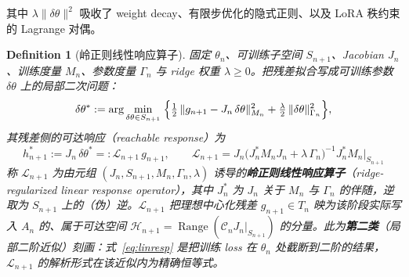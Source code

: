 \documentclass[11pt,a4paper]{article}
\newtheorem{definition}[theorem]{Definition}
\newcommand{\cL}{\mathcal{L}}
\newcommand{\cH}{\mathcal{H}}
\newcommand{\Range}{\operatorname{Range}}
\newcommand{\Center}{\mathcal{C}}
\begin{document}
其中 $\lambda\|\delta\theta\|^2$ 吸收了 weight decay、有限步优化的隐式正则、以及 LoRA 秩约束的 Lagrange 对偶。


\begin{definition}[岭正则线性响应算子]\label{def:linresp}
固定 $\theta_n$、可训练子空间 $S_{n+1}$、Jacobian $J_n$、训练度量 $M_n$、参数度量 $\Gamma_n$ 与 ridge 权重 $\lambda\ge 0$。把残差拟合写成可训练参数 $\delta\theta$ 上的局部二次问题：
\begin{equation}\label{eq:linresp}
\delta\theta^* := \arg\min_{\delta\theta\in S_{n+1}}\;\Bigl\{\tfrac{1}{2}\,\|g_{n+1}-J_n\,\delta\theta\|_{M_n}^2 + \tfrac{\lambda}{2}\,\|\delta\theta\|_{\Gamma_n}^2\Bigr\},
\end{equation}
其残差侧的可达响应（reachable response）为
\begin{equation}\label{eq:linresp_op}
\boxed{\;h^*_{n+1} := J_n\,\delta\theta^* =: \cL_{n+1}\,g_{n+1},\qquad \cL_{n+1} = J_n\bigl(J_n^{\!*}M_n J_n + \lambda\,\Gamma_n\bigr)^{-1}J_n^{\!*}M_n\big|_{S_{n+1}}\;}
\end{equation}
称 $\cL_{n+1}$ 为由元组 $(J_n,S_{n+1},M_n,\Gamma_n,\lambda)$ 诱导的\textbf{岭正则线性响应算子}（ridge-regularized linear response operator），其中 $J_n^{\!*}$ 为 $J_n$ 关于 $M_n$ 与 $\Gamma_n$ 的伴随，逆取为 $S_{n+1}$ 上的（伪）逆。$\cL_{n+1}$ 把理想中心化残差 $g_{n+1}\in T_n$ 映为该阶段实际写入 $A_n$ 的、属于可达空间 $\cH_{n+1}=\Range(\Center_n J_n|_{S_{n+1}})$ 的分量。此为\textbf{第二类}（局部二阶近似）刻画：式~\eqref{eq:linresp} 是把训练 loss 在 $\theta_n$ 处截断到二阶的结果，$\cL_{n+1}$ 的解析形式在该近似内为精确恒等式。
\end{definition}
\end{document}
